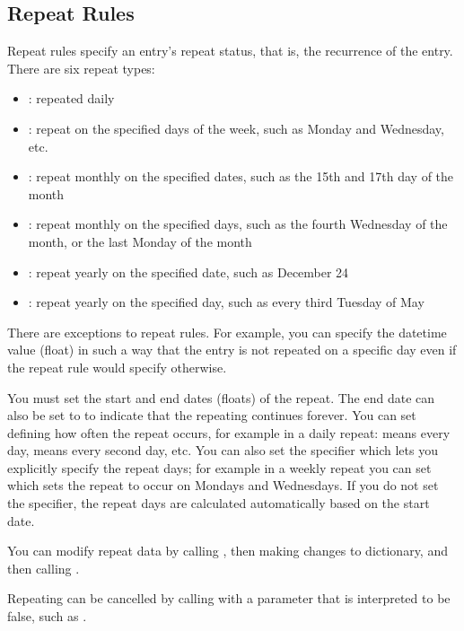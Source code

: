 \subsection{Repeat Rules}
\label{subsec:repeat}

Repeat rules specify an entry's repeat status, that is, the recurrence of 
the entry. There are six repeat types: 

\begin{itemize}
\item {}: repeated daily
\item {}: repeat on the specified days of the week, such as Monday and Wednesday, etc.
\item {}: repeat monthly on the specified dates, such as the 15th and 17th day of the month
\item {}: repeat monthly on the specified days, such as the fourth Wednesday of the month, or the last Monday of the month
\item {}: repeat yearly on the specified date, such as December 24
\item {}: repeat yearly on the specified day, such as every third Tuesday of May
\end{itemize}

There are exceptions to repeat rules. For example, you can specify the 
datetime value (float) in such a way that the entry is not repeated on a 
specific day even if the repeat rule would specify otherwise.

You must set the start and end dates (floats) of the repeat. The end date 
can also be set to  to indicate that the repeating continues 
forever. You can set  defining how often the repeat occurs, 
for example in a daily repeat:  means every day,  means 
every second day, etc. You can also set the  specifier which 
lets you explicitly specify the repeat days; for example in a weekly repeat 
you can set  which sets the repeat to occur on Mondays 
and Wednesdays. If you do not set the  specifier, the repeat 
days are calculated automatically based on the start date.

You can modify repeat data by calling , then making changes to  
dictionary, and then calling .

Repeating can be cancelled by calling  with a 
parameter that is interpreted to be false, such as 
.

